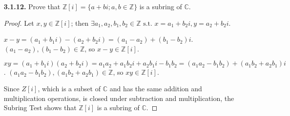\documentclass[12pt]{article}
\newcommand{\zee}{\mathbb{Z}}
\newcommand{\st}{\text{ s.t. }}
\begin{document}
\begin{itemize}
\item[\textbf{3.1.12.}] Prove that $\zee[i]=\{a+bi; a,b\in\zee \}$ is a subring of $\mathbb{C}$.

\begin{proof}
Let $x, y \in \zee[i]$; then $\exists a_1, a_2, b_1, b_2 \in \zee \st x = a_1 + b_2 i, y = a_2 + b_2 i$.
\par
$x-y = (a_1 + b_1 i) - (a_2 + b_2 i) = (a_1 - a_2) + (b_1 - b_2)i$.
$(a_1 - a_2), (b_1 - b_2) \in \zee$, so $x-y \in \zee[i]$.
\par
$xy = (a_1 + b_1 i) (a_2 + b_2 i) = a_1 a_2 + a_1 b_2 i + a_2 b_1 i - b_1 b_2 = (a_1 a_2 - b_1 b_2) + (a_1 b_2 + a_2 b_1)i$.
$(a_1 a_2 - b_1 b_2), (a_1 b_2 + a_2 b_1) \in \zee$, so $xy \in \zee[i]$.
\par
Since $Z[i]$, which is a subset of $\mathbb{C}$ and has the same addition and multiplication operations, is closed under subtraction and multiplication, the Subring Test shows that $\zee[i]$ is a subring of $\mathbb{C}$.
\end{proof}

\end{itemize}
\end{document}

